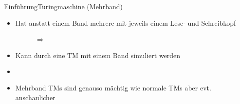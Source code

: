 \documentclass[ignorenonframetext,]{beamer}
\begin{document}
\begin{frame}{Einführung}{Turingmaschine (Mehrband)}

\begin{itemize}
\itemsep1pt\parskip0pt
\item
  Hat anstatt einem Band mehrere mit jeweils einem Lese- und
  Schreibkopf\\
\begin{figure}[htbp]
\begin{minipage}{0.4\textwidth}
\centering
{}
\end{minipage}
\begin{minipage}{0.1\textwidth}
\centering
$\Rightarrow$
\end{minipage}
\begin{minipage}{0.4\textwidth}
\centering
{}
\end{minipage}
\end{figure}

\item
  Kann durch eine TM mit einem Band simuliert
  werden\\
\item[]

\item
  Mehrband TMs sind genauso mächtig wie normale TMs aber evt.
  anschaulicher
\end{itemize}

\end{frame}
\end{document}
